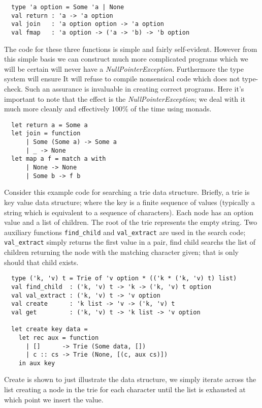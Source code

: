 \documentclass[a4paper,10pt]{article}
\theoremstyle{definition}
\begin{document}
\begin{verbatim}
  type 'a option = Some 'a | None
  val return : 'a -> 'a option
  val join   : 'a option option -> 'a option
  val fmap   : 'a option -> ('a -> 'b) -> 'b option
\end{verbatim}

The code for these three functions is simple and fairly self-evident.
However from this simple basis we can construct much more complicated programs which we
will be certain will never have a \textit{NullPointerException}.
Furthermore the type system will ensure 
It will refuse to compile nonsensical code which does not type-check.
Such an assurance is invaluable in creating correct programs.
Here it's important to note that the effect is the \textit{NullPointerException};
we deal with it much more cleanly and effectively 100\% of the time using monads.

\begin{verbatim}
  let return a = Some a
  let join = function
      | Some (Some a) -> Some a
      | _ -> None
  let map a f = match a with
      | None -> None
      | Some b -> f b
\end{verbatim}

Consider this example code for searching a trie data structure.
Briefly, a trie is key value data structure;
where the key is a finite sequence of values
(typically a string which is equivalent to a sequence of characters).
Each node has an option value and a list of children.
The root of the trie represents the empty string.
Two auxiliary functions \texttt{find\_child} and \texttt{val\_extract}
are used in the search code; \texttt{val\_extract}
simply returns the first value in a pair,
find child searchs the list of children returning
the node with the matching character given;
that is only should that child exists.

\begin{verbatim}
  type ('k, 'v) t = Trie of 'v option * (('k * ('k, 'v) t) list)
  val find_child  : ('k, 'v) t -> 'k -> ('k, 'v) t option
  val val_extract : ('k, 'v) t -> 'v option
  val create      : 'k list -> 'v -> ('k, 'v) t
  val get         : ('k, 'v) t -> 'k list -> 'v option

  let create key data =
    let rec aux = function
      | []      -> Trie (Some data, [])
      | c :: cs -> Trie (None, [(c, aux cs)])
    in aux key
\end{verbatim}

Create is shown to just illustrate the data structure,
we simply iterate across the list creating a node in the trie for each character
until the list is exhausted at which point we insert the value.
\end{document}
